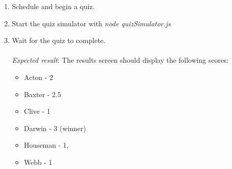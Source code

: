 \begin{enumerate}
\begin{Verbatim}[fontsize=\small]
  { house: 'webb',       year: 8,       answer: 'B',      peek: false }
  { house: 'darwin',     year: 9,       answer: 'A',      peek: false }
  { house: 'baxter',     year: 8,       answer: 'B',      peek: false }
  { house: 'clive',      year: 7,       answer: 'B',      peek: false }
  { house: 'darwin',     year: 9,       answer: 'C',      peek: true  }
  { house: 'baxter',     year: 7,       answer: 'A',      peek: false }
  { house: 'acton',      year: 9,       answer: 'D',      peek: true  }
  { house: 'houseman',   year: 9,       answer: 'A',      peek: true  }
  { house: 'webb',       year: 11,      answer: 'D',      peek: true  }
  { house: 'clive',      year: 8,       answer: 'B',      peek: false }
  { house: 'baxter',     year: 10,      answer: 'C',      peek: false }
  { house: 'houseman',   year: 8,       answer: 'C',      peek: false }
  { house: 'clive',      year: 10,      answer: 'D',      peek: false }
  { house: 'darwin',     year: 7,       answer: 'B',      peek: true  }
  { house: 'baxter',     year: 7,       answer: 'D',      peek: false }
  { house: 'webb',       year: 9,       answer: 'B',      peek: true  }
  { house: 'houseman',   year: 8,       answer: 'B',      peek: true  }
  { house: 'webb',       year: 9,       answer: 'A',      peek: false }
  \end{Verbatim}
  \item Schedule and begin a quiz.
  \item Start the quiz simulator with \textit{node quizSimulator.js}
  \item Wait for the quiz to complete.\\\\
  \textit{Expected result}: The results screen should display the following scores:

  \begin{itemize}
    \item Acton - 2
    \item Baxter - 2.5
    \item Clive - 1
    \item Darwin - 3 (winner)
    \item Houseman - 1,
    \item Webb - 1
  \end{itemize}
\end{enumerate}
